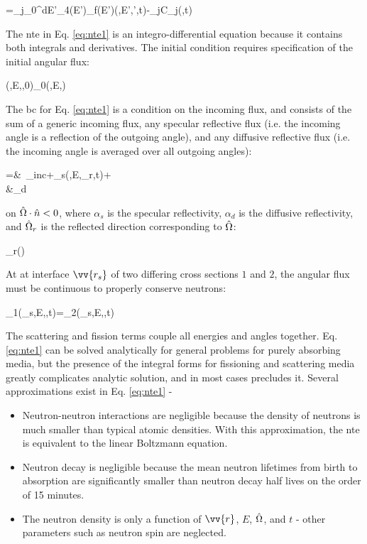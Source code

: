 \beq
\label{eq:DelayedNeutrons}
=\beta_j\int_{0}^\infty dE'\int_{4\pi}\nu(E')\Sigma_f(E')\psi(,E',\hO',t)-\lambda_jC_j(,t)
\eeq

The \gls{nte} in Eq. \eqref{eq:nte1} is an integro-differential equation because it contains both integrals and derivatives. The initial condition requires specification of the initial angular flux:

\beq
\psi(,E,\hO,0)\equiv\psi_0(,E,\hO)
\eeq

The \gls{bc} for Eq. \eqref{eq:nte1} is a condition on the incoming flux, and consists of the sum of a generic incoming flux, any specular reflective flux (i.e. the incoming angle is a reflection of the outgoing angle), and any diffusive reflective flux (i.e. the incoming angle is averaged over all outgoing angles):

\beqa
\label{eq:NTEBCs}
\psi\seat=&\ \psi_{inc}\seat+\alpha_s\seat\psi(,E,\hO_r,t)+\\
&\hspace{1cm}\alpha_d\seat{}
\eeqa

on \(\hat{\Omega}\cdot\hat{n}<0\), where \(\alpha_s\) is the specular reflectivity, \(\alpha_d\) is the diffusive reflectivity, and \(\hat{\Omega}_r\) is the reflected direction corresponding to \(\hat{\Omega}\):

\beq
\label{eq:hOrDef}
\hO_r\equiv{}\left(\hO\cdot{}\right)
\eeq

At at interface \(\vv{r_s}\) of two differing cross sections \(1\) and \(2\), the angular flux must be continuous to properly conserve neutrons:

\beq
\label{eq:NTE_interface}
\psi_1(_s,E,\hO,t)=\psi_2(_s,E,\hO,t)
\eeq

The scattering and fission terms couple all energies and angles together. Eq. \eqref{eq:nte1} can be solved analytically for general problems for purely absorbing media, but the presence of the integral forms for fissioning and scattering media greatly complicates analytic solution, and in most cases precludes it. Several approximations exist in Eq. \eqref{eq:nte1} -

\begin{itemize}
\item Neutron-neutron interactions are negligible because the density of neutrons is much smaller than typical atomic densities. With this approximation, the \gls{nte} is equivalent to the linear Boltzmann equation.
\item Neutron decay is negligible because the mean neutron lifetimes from birth to absorption are significantly smaller than neutron decay half lives on the order of 15 minutes.
\item The neutron density is only a function of \(\vv{r}\), \(E\), \(\hat{\Omega}\), and \(t\) - other parameters such as neutron spin are neglected.
\end{itemize}

